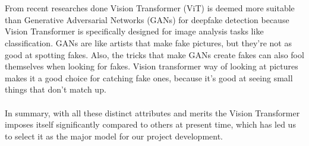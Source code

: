 \\\\From recent researches done Vision Transformer (ViT) is deemed more suitable than Generative Adversarial Networks (GANs) for deepfake detection because Vision Transformer is specifically designed for image analysis tasks like classification. GANs are like artists that make fake pictures, but they're not as good at spotting fakes. Also, the tricks that make GANs create fakes can also fool themselves when looking for fakes. Vision transformer way of looking at pictures makes it a good choice for catching fake ones, because it's good at seeing small things that don't match up.
\\\\
In summary, with all these distinct attributes and merits the Vision Transformer imposes itself significantly compared to others at present time, which has led us to select it as the major model for our project development.


